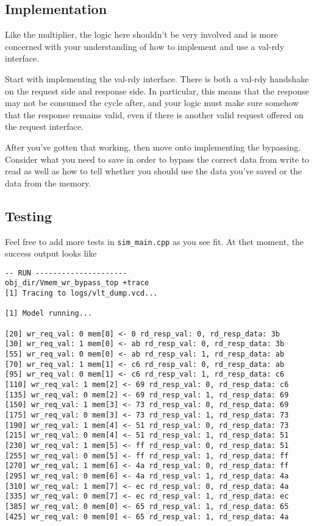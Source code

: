 \documentclass{article}
\begin{document}
\subsection*{Implementation}
Like the multiplier, the logic here shouldn't be very involved and is more
concerned with your understanding of how to implement and use a val-rdy
interface.

Start with implementing the val-rdy interface. There is both a val-rdy handshake
on the request side and response side. In particular, this means that the
response may not be consumed the cycle after, and your logic must make sure
somehow that the response remains valid, even if there is another valid request
offered on the request interface.

After you've gotten that working, then move onto implementing the bypassing.
Consider what you need to save in order to bypass the correct data from write to
read as well as how to tell whether you should use the data you've saved or the
data from the memory.

\subsection*{Testing}
Feel free to add more tests in \texttt{sim\_main.cpp} as you see fit. At thet
moment, the success output looks like
\begin{verbatim}
-- RUN ---------------------
obj_dir/Vmem_wr_bypass_top +trace
[1] Tracing to logs/vlt_dump.vcd...

[1] Model running...

[20] wr_req_val: 0 mem[0] <- 0 rd_resp_val: 0, rd_resp_data: 3b
[30] wr_req_val: 1 mem[0] <- ab rd_resp_val: 0, rd_resp_data: 3b
[55] wr_req_val: 0 mem[0] <- ab rd_resp_val: 1, rd_resp_data: ab
[70] wr_req_val: 1 mem[1] <- c6 rd_resp_val: 0, rd_resp_data: ab
[95] wr_req_val: 0 mem[1] <- c6 rd_resp_val: 1, rd_resp_data: c6
[110] wr_req_val: 1 mem[2] <- 69 rd_resp_val: 0, rd_resp_data: c6
[135] wr_req_val: 0 mem[2] <- 69 rd_resp_val: 1, rd_resp_data: 69
[150] wr_req_val: 1 mem[3] <- 73 rd_resp_val: 0, rd_resp_data: 69
[175] wr_req_val: 0 mem[3] <- 73 rd_resp_val: 1, rd_resp_data: 73
[190] wr_req_val: 1 mem[4] <- 51 rd_resp_val: 0, rd_resp_data: 73
[215] wr_req_val: 0 mem[4] <- 51 rd_resp_val: 1, rd_resp_data: 51
[230] wr_req_val: 1 mem[5] <- ff rd_resp_val: 0, rd_resp_data: 51
[255] wr_req_val: 0 mem[5] <- ff rd_resp_val: 1, rd_resp_data: ff
[270] wr_req_val: 1 mem[6] <- 4a rd_resp_val: 0, rd_resp_data: ff
[295] wr_req_val: 0 mem[6] <- 4a rd_resp_val: 1, rd_resp_data: 4a
[310] wr_req_val: 1 mem[7] <- ec rd_resp_val: 0, rd_resp_data: 4a
[335] wr_req_val: 0 mem[7] <- ec rd_resp_val: 1, rd_resp_data: ec
[385] wr_req_val: 0 mem[0] <- 65 rd_resp_val: 1, rd_resp_data: 65
[425] wr_req_val: 0 mem[0] <- 65 rd_resp_val: 1, rd_resp_data: 4a
\end{verbatim}
\end{document}
